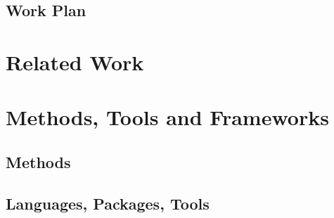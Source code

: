 \documentclass[11pt]{article}
\begin{document}

\subsection{Work Plan} \label{work-plan}


\section{Related Work} \label{related-work}

\section{Methods, Tools and Frameworks} \label{methods-tools-frameworks}

\subsection{Methods} \label{methods}

   



             
\subsection{Languages, Packages, Tools} \label{languages-packages-tools}



\end{document}
